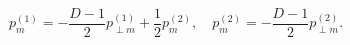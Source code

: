 \begin{equation}\label{relcoef}
p_m^{(1)}=-\frac{D-1}{2}p_{\perp
m}^{(1)}+\frac{1}{2}p_m^{(2)},\quad
p_m^{(2)}=-\frac{D-1}{2}p_{\perp m}^{(2)}.
\end{equation}

